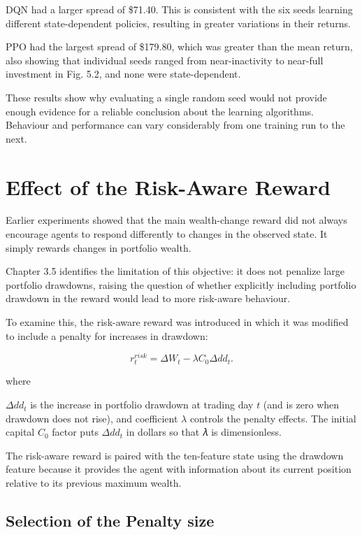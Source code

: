 DQN had a larger spread of \$71.40. This is consistent with the six
seeds learning different state-dependent policies, resulting in greater
variations in their returns.

PPO had the largest spread of \$179.80, which was greater than the mean
return, also showing that individual seeds ranged from near-inactivity
to near-full investment in Fig. 5.2, and none were state-dependent.

These results show why evaluating a single random seed would not provide
enough evidence for a reliable conclusion about the learning algorithms.
Behaviour and performance can vary considerably from one training run to
the next.

\section{Effect of the Risk-Aware Reward}

Earlier experiments showed that the main wealth-change reward did not
always encourage agents to respond differently to changes in the
observed state. It simply rewards changes in portfolio wealth.

Chapter 3.5 identifies the limitation of this objective: it does not
penalize large portfolio drawdowns, raising the question of whether
explicitly including portfolio drawdown in the reward would lead to more
risk-aware behaviour.

To examine this, the risk-aware reward was introduced in which it was
modified to include a penalty for increases in drawdown:

\[r_{t}^{risk} = \Delta W_{t} - \lambda C_{0}\Delta dd_{t}.\]

where

\(\Delta dd_{t}\) is the increase in portfolio drawdown at trading day
\(t\) (and is zero when drawdown does not rise), and coefficient
\(\lambda\) controls the penalty effects. The initial capital \(C_{0}\)
factor puts \(\Delta dd_{t}\) in dollars so that 𝜆 is dimensionless.

The risk-aware reward is paired with the ten-feature state using the
drawdown feature because it provides the agent with information about
its current position relative to its previous maximum wealth.

\subsection{Selection of the Penalty size}

